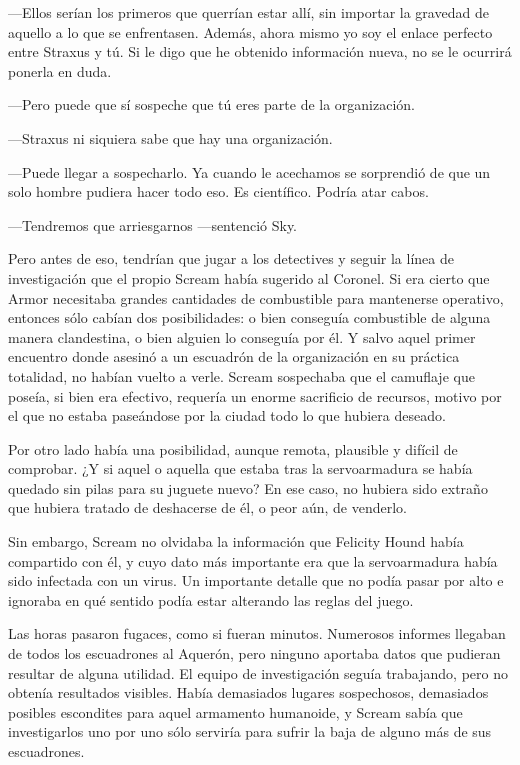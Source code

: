 ---Ellos serían los primeros que querrían estar allí, sin importar la gravedad de aquello a lo que se enfrentasen. Además, ahora mismo yo soy el enlace perfecto entre Straxus y tú. Si le digo que he obtenido información nueva, no se le ocurrirá ponerla en duda.

---Pero puede que sí sospeche que tú eres parte de la organización.

---Straxus ni siquiera sabe que hay una organización.

---Puede llegar a sospecharlo. Ya cuando le acechamos se sorprendió de que un solo hombre pudiera hacer todo eso. Es científico. Podría atar cabos.

---Tendremos que arriesgarnos ---sentenció Sky.

Pero antes de eso, tendrían que jugar a los detectives y seguir la línea de investigación que el propio Scream había sugerido al Coronel. Si era cierto que Armor necesitaba grandes cantidades de combustible para mantenerse operativo, entonces sólo cabían dos posibilidades: o bien conseguía combustible de alguna manera clandestina, o bien alguien lo conseguía por él. Y salvo aquel primer encuentro donde asesinó a un escuadrón de la organización en su práctica totalidad, no habían vuelto a verle. Scream sospechaba que el camuflaje que poseía, si bien era efectivo, requería un enorme sacrificio de recursos, motivo por el que no estaba paseándose por la ciudad todo lo que hubiera deseado.

Por otro lado había una posibilidad, aunque remota, plausible y difícil de comprobar. ¿Y si aquel o aquella que estaba tras la servoarmadura se había quedado sin pilas para su juguete nuevo? En ese caso, no hubiera sido extraño que hubiera tratado de deshacerse de él, o peor aún, de venderlo.

Sin embargo, Scream no olvidaba la información que Felicity Hound había compartido con él, y cuyo dato más importante era que la servoarmadura había sido infectada con un virus. Un importante detalle que no podía pasar por alto e ignoraba en qué sentido podía estar alterando las reglas del juego.

Las horas pasaron fugaces, como si fueran minutos. Numerosos informes llegaban de todos los escuadrones al Aquerón, pero ninguno aportaba datos que pudieran resultar de alguna utilidad. El equipo de investigación seguía trabajando, pero no obtenía resultados visibles. Había demasiados lugares sospechosos, demasiados posibles escondites para aquel armamento humanoide, y Scream sabía que investigarlos uno por uno sólo serviría para sufrir la baja de alguno más de sus escuadrones.

